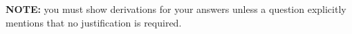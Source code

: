 \documentclass[submit]{harvardml}
\begin{document}
\noindent \textbf{NOTE:} you must show derivations for your answers unless a question explicitly mentions that no justification is required.


\newpage

\newpage



\newpage

\newpage

\newpage

\end{document}
